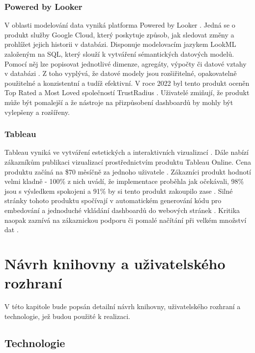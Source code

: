 \documentclass[czech, bc, kiv, he, iso690numb]{fasthesis}
\begin{document}
\subsection{Powered by Looker}
V oblasti modelování data vyniká platforma Powered by Looker \cite{bestEmbTools2023}. Jedná se o produkt služby Google Cloud, který poskytuje způsob, jak sledovat změny a prohlížet jejich
historii v databázi. Disponuje modelovacím jazykem LookML založeným na SQL, který slouží k vytváření sémantických datových modelů. Pomocí něj lze popisovat jednotlivé dimenze, agregáty,
výpočty či datové vztahy v databázi \cite{googleLookMLDoc}. Z toho vyplývá, že datové modely jsou rozšiřitelné, opakovatelně použitelné a konzistentní a tudíž efektivní. V roce 2022 byl tento produkt
oceněn Top Rated a Most Loved společností TrustRadius \cite{trustRadiusDiscusionLooker}. Uživatelé zmiňují, že produkt může být pomalejší a že nástroje na přizpůsobení dashboardů by mohly být
vylepšeny a rozšířeny.


\subsection{Tableau}
Tableau vyniká ve vytváření estetických a interaktivních vizualizací \cite{tableauBlog}. Dále nabízí zákazníkům publikaci vizualizací prostřednictvím produktu Tableau Online. Cena produktu začíná na \$70 měsíčně za jednoho uživatele \cite{trustRadiusTableAU}. 
Zákazníci produkt hodnotí velmi kladně - 100\% z nich uvádí, že implementace proběhla jak očekávali, 98\% jsou s výsledkem spokojeni a 91\% by si tento produkt zakoupilo zase \cite{trustRadiusTableAU}. Silné stránky 
tohoto produktu spočívají v automatickém generování kódu pro embedování a jednoduché vkládání dashboardů do webových stránek \cite{tableauBlog}. Kritika naopak zaznívá na zákaznickou podporu či pomalé načítání při velkém množství dat \cite{trustRadiusTableAU}.

%
%
%
%
\chapter{Návrh knihovny a uživatelského rozhraní}

V této kapitole bude popsán detailní návrh knihovny, uživatelského rozhraní a technologie, jež budou použité k realizaci. 

\section{Technologie}
\end{document}
